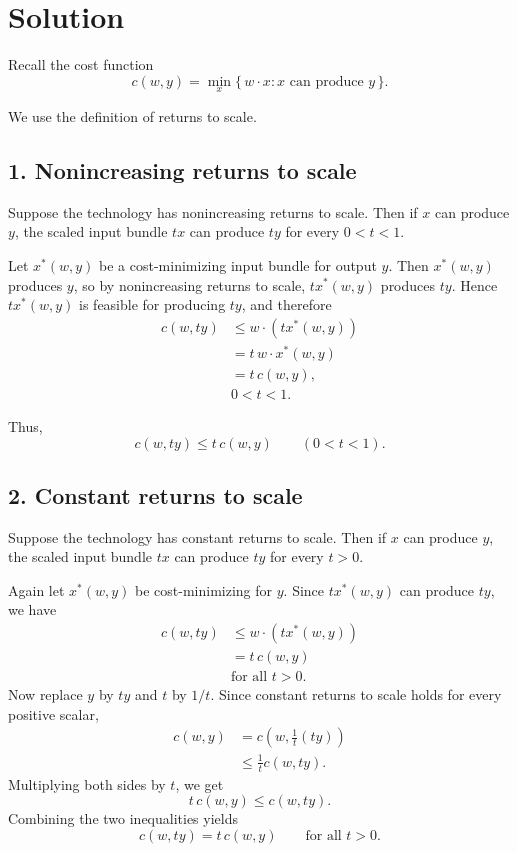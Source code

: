 \section*{Solution}

Recall the cost function
\[
c(w,y)=\min_{x}\{\,w\cdot x : x \text{ can produce } y\,\}.
\]

We use the definition of returns to scale.

\subsection*{1. Nonincreasing returns to scale}

Suppose the technology has nonincreasing returns to scale.  
Then if \(x\) can produce \(y\), the scaled input bundle \(tx\) can produce \(ty\) for every \(0<t<1\).

Let \(x^*(w,y)\) be a cost-minimizing input bundle for output \(y\). Then \(x^*(w,y)\) produces \(y\), so by nonincreasing returns to scale, \(t x^*(w,y)\) produces \(ty\). Hence \(t x^*(w,y)\) is feasible for producing \(ty\), and therefore
\[
\begin{aligned}
c(w,ty)
&\le w\cdot (t x^*(w,y))\\
&=t\, w\cdot x^*(w,y)\\
&=t\,c(w,y), \\
&0<t<1.
\end{aligned}
\]

Thus,
\[
\boxed{c(w,ty)\le t\,c(w,y)\qquad (0<t<1).}
\]

\subsection*{2. Constant returns to scale}

Suppose the technology has constant returns to scale.  
Then if \(x\) can produce \(y\), the scaled input bundle \(tx\) can produce \(ty\) for every \(t>0\).

Again let \(x^*(w,y)\) be cost-minimizing for \(y\). Since \(t x^*(w,y)\) can produce \(ty\), we have
\[
\begin{aligned}
c(w,ty)
&\le w\cdot (t x^*(w,y))\\
&=t\,c(w,y)\\
&\text{for all } t>0.
\end{aligned}
\]
Now replace \(y\) by \(ty\) and \(t\) by \(1/t\). Since constant returns to scale holds for every positive scalar,
\[
\begin{aligned}
c(w,y)
&=c\!\left(w,\frac{1}{t}(ty)\right)\\
&\le \frac{1}{t}c(w,ty).
\end{aligned}
\]
Multiplying both sides by \(t\), we get
\[
t\,c(w,y)\le c(w,ty).
\]
Combining the two inequalities yields
\[
c(w,ty)=t\,c(w,y)
\qquad \text{for all } t>0.
\]

